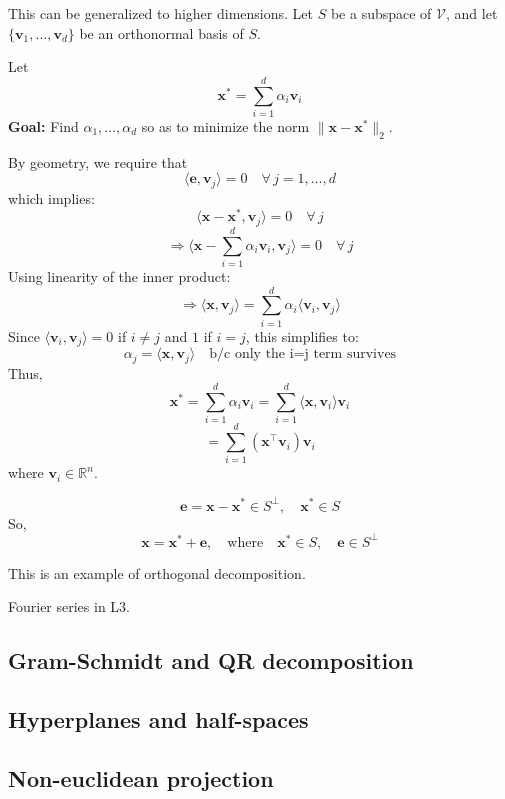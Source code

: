         \begin{example}
        This can be generalized to higher dimensions. Let \( S \) be a subspace of \( \mathcal{V} \), and let \( \{ \mathbf{v}_1, \dots, \mathbf{v}_d \} \) be an orthonormal basis of \( S \).

        Let 
        \[
        \mathbf{x}^* = \sum_{i=1}^{d} \alpha_i \mathbf{v}_i
        \]
        \textbf{Goal:} Find \( \alpha_1, \dots, \alpha_d \) so as to minimize the norm \( \|\mathbf{x} - \mathbf{x}^*\|_2 \).

        By geometry, we require that 
        \[
        \langle \mathbf{e}, \mathbf{v}_j \rangle = 0 \quad \forall \, j = 1, \dots, d
        \]
        which implies:
        \[
        \langle \mathbf{x} - \mathbf{x}^*, \mathbf{v}_j \rangle = 0 \quad \forall \, j
        \]
        \[
        \Rightarrow \langle \mathbf{x} - \sum_{i=1}^{d} \alpha_i \mathbf{v}_i, \mathbf{v}_j \rangle = 0 \quad \forall \, j
        \]
        Using linearity of the inner product:
        \[
        \Rightarrow \langle \mathbf{x}, \mathbf{v}_j \rangle = \sum_{i=1}^{d} \alpha_i \langle \mathbf{v}_i, \mathbf{v}_j \rangle
        \]
        Since \( \langle \mathbf{v}_i, \mathbf{v}_j \rangle = 0 \) if \( i \neq j \) and \( 1 \) if \( i = j \), this simplifies to:
        \[
        \alpha_j = \langle \mathbf{x}, \mathbf{v}_j \rangle \quad \text{b/c only the i=j term survives}
        \]
        Thus,
        \[
        \mathbf{x}^* = \sum_{i=1}^{d} \alpha_i \mathbf{v}_i = \sum_{i=1}^{d} \langle \mathbf{x}, \mathbf{v}_i \rangle \mathbf{v}_i
        \]
        \[
        = \sum_{i=1}^{d} (\mathbf{x}^\top \mathbf{v}_i) \mathbf{v}_i
        \]
        where \( \mathbf{v}_i \in \mathbb{R}^n \).

        \[
        \mathbf{e} = \mathbf{x} - \mathbf{x}^* \in S^\perp, \quad \mathbf{x}^* \in S
        \]
        So, 
        \[
        \mathbf{x} = \mathbf{x}^* + \mathbf{e}, \quad \text{where} \quad \mathbf{x}^* \in S, \quad \mathbf{e} \in S^\perp
        \]

        This is an example of orthogonal decomposition.
        \end{example}

        \begin{example}
            Fourier series in L3.
        \end{example}

\subsection{Gram-Schmidt and QR decomposition}
\subsection{Hyperplanes and half-spaces}
\subsection{Non-euclidean projection}
